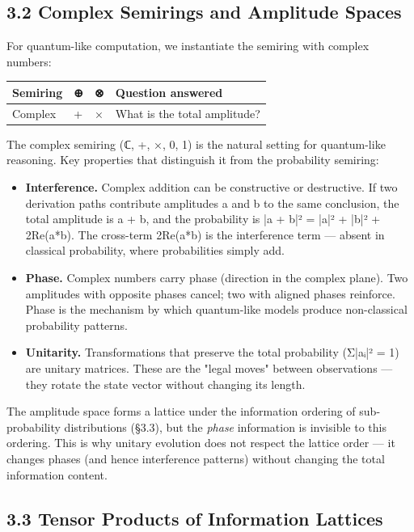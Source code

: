 \documentclass[11pt]{article}
\begin{document}
\subsection{3.2 Complex Semirings and Amplitude Spaces}
\label{sec:orgc4bee4e}

For quantum-like computation, we instantiate the semiring with complex numbers:

\begin{center}
\begin{tabular}{llll}
Semiring & ⊕ & ⊗ & Question answered\\
\hline
Complex & + & × & What is the total amplitude?\\
\end{tabular}
\end{center}

The complex semiring (ℂ, +, ×, 0, 1) is the natural setting for quantum-like
reasoning. Key properties that distinguish it from the probability semiring:

\begin{itemize}
\item \textbf{Interference.} Complex addition can be constructive or destructive. If two
derivation paths contribute amplitudes a and b to the same conclusion, the
total amplitude is a + b, and the probability is |a + b|² = |a|² + |b|² +
2Re(a*b). The cross-term 2Re(a*b) is the interference term --- absent in
classical probability, where probabilities simply add.

\item \textbf{Phase.} Complex numbers carry phase (direction in the complex plane). Two
amplitudes with opposite phases cancel; two with aligned phases reinforce.
Phase is the mechanism by which quantum-like models produce non-classical
probability patterns.

\item \textbf{Unitarity.} Transformations that preserve the total probability (Σ|aᵢ|² = 1)
are unitary matrices. These are the "legal moves" between observations ---
they rotate the state vector without changing its length.
\end{itemize}

The amplitude space forms a lattice under the information ordering of
sub-probability distributions (§3.3), but the \emph{phase} information is invisible
to this ordering. This is why unitary evolution does not respect the lattice
order --- it changes phases (and hence interference patterns) without changing
the total information content.
\subsection{3.3 Tensor Products of Information Lattices}
\label{sec:orge930f81}
\end{document}
